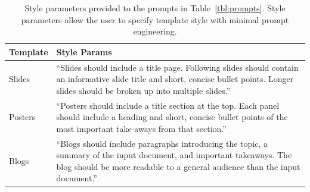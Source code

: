\begin{table}[]
\small
\centering
\begin{tabular}{lp{}}
 Template & Style Params \\ \hline
Slides & ``Slides should include a title page. Following  slides should contain an informative slide  title and short, concise bullet points. Longer slides should be broken up into multiple slides.''
\\ \hdashline[0.5pt/3pt]
Posters & ``Posters should include a title section at the top. Each panel should include a heading and short, concise bullet points of the most important take-aways from that section.''
\\ \hdashline[0.5pt/3pt]
Blogs & ``Blogs should include paragraphs introducing the topic, a summary of the input document, and important takeaways. The blog should be more readable to a general audience than the input document.''
\end{tabular}
\caption{Style parameters provided to the prompts in Table~\ref{tbl:prompts}. Style parameters allow the user to specify template style with minimal prompt engineering.}
\label{tbl:style-params}
\end{table}